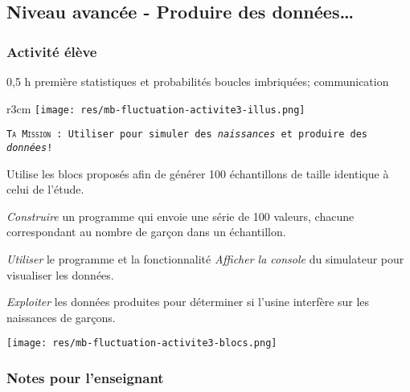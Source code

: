 %
%

\newpage

\subsection{Niveau avancée - Produire des données\ldots}

\subsubsection{Activité élève}

\cartouche
{0,5 h}         %
{première}           %
{statistiques et probabilités}        %
{}     %
{boucles imbriquées; communication}       %


\begin{wrapfigure}{r}{3cm}
    \texttt{[image: res/mb-fluctuation-activite3-illus.png]}
\end{wrapfigure}

\begin{eleve}
    \texttt{\textsc{Ta Mission} : Utiliser \mb pour simuler des \emph{naissances} et produire des \emph{données}!}

    Utilise les blocs proposés afin de générer 100 échantillons de taille identique à celui de l'étude.

    \emph{Construire} un programme qui envoie une série de 100 valeurs, chacune correspondant au nombre de garçon dans un échantillon.

    \emph{Utiliser} le programme et la fonctionnalité \emph{Afficher la console} du simulateur pour visualiser les données.

    \emph{Exploiter} les données produites pour déterminer si l'usine interfère sur les naissances de garçons.

    \texttt{[image: res/mb-fluctuation-activite3-blocs.png]}

\end{eleve}

\newpage

\subsubsection{Notes pour l'enseignant}

